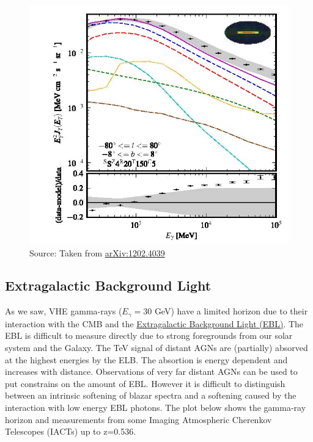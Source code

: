 \documentclass[
  letterpaper,
  DIV=11,
  numbers=noendperiod]{scrreprt}
\begin{document}
\begin{figure}[H]

{\centering \includegraphics{images/GalacticCenter_Fermi.jpg}

}

\caption{Source: Taken from
\href{http://arxiv.org/abs/1202.4039}{arXiv:1202.4039}}

\end{figure}%

\subsection{Extragalactic Background
Light}\label{extragalactic-background-light}

As we saw, VHE gamma-rays (\(E_\gamma =30\) GeV) have a limited horizon
due to their interaction with the CMB and the
\href{http://en.wikipedia.org/wiki/Extragalactic_background_light}{Extragalactic
Background Light (EBL)}. The EBL is difficult to measure directly due to
strong foregrounds from our solar system and the Galaxy. The TeV signal
of distant AGNs are (partially) absorved at the highest energies by the
ELB. The absortion is energy dependent and increases with distance.
Observations of very far distant AGNs can be used to put constrains on
the amount of EBL. However it is difficult to distinguish between an
intrinsic softening of blazar spectra and a softening caused by the
interaction with low energy EBL photons. The plot below shows the
gamma-ray horizon and measurements from some Imaging Atmospheric
Cherenkov Telescopes (IACTs) up to z=0.536.
\end{document}
